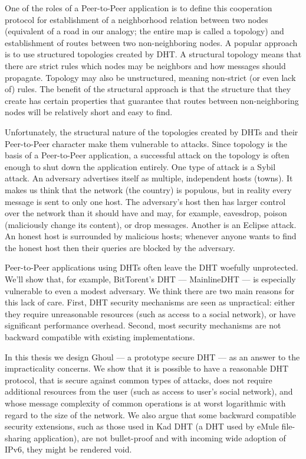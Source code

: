 One of the roles of a Peer-to-Peer application is to define this cooperation
protocol for establishment of a neighborhood relation between two nodes
(equivalent of a road in our analogy; the entire map is called a topology) and
establishment of routes between two non-neighboring nodes.
A popular approach is to use structured topologies created by DHT.
A structural topology means that there are strict rules which nodes may be
neighbors and how messages should propagate.
Topology may also be unstructured, meaning non-strict (or even lack of) rules.
The benefit of the structural approach is that the structure that they create
has certain properties that guarantee that routes between non-neighboring nodes
will be relatively short and easy to find.

Unfortunately, the structural nature of the topologies created by DHTs and
their Peer-to-Peer character make them vulnerable to attacks.
Since topology is the basis of a Peer-to-Peer application, a successful attack
on the topology is often enough to shut down the application entirely.
One type of attack is a Sybil attack.
An adversary advertises itself as multiple, independent hosts (towns).
It makes us think that the network (the country) is populous, but in reality
every message is sent to only one host.
The adversary's host then has larger control over the network than it should
have and may, for example, eavesdrop, poison (maliciously change its content), or
drop messages.
Another is an Eclipse attack.
An honest host is surrounded by malicious hosts; whenever anyone wants to find
the honest host then their queries are blocked by the adversary.

Peer-to-Peer applications using DHTs often leave the DHT woefully unprotected.
We'll show that, for example, BitTorent's DHT --- MainlineDHT --- is especially
vulnerable to even a modest adversary.
We think there are two main reasons for this lack of care.
First, DHT security mechanisms are seen as unpractical: either they require
unreasonable resources (such as access to a social network), or have significant
performance overhead.
Second, most security mechanisms are not backward compatible with existing
implementations.

In this thesis we design Ghoul --- a prototype secure DHT ---
as an answer to the impracticality concerns.
We show that it is possible to have a reasonable DHT protocol, that is secure
against common types of attacks, does not require additional resources from the
user (such as access to user's social network), and whose message complexity of
common operations is at worst logarithmic with regard to the size of the
network.
We also argue that some backward compatible security extensions, such as those
used in Kad DHT (a DHT used by eMule file-sharing application), are not
bullet-proof and with incoming wide adoption of IPv6, they might be rendered
void.


